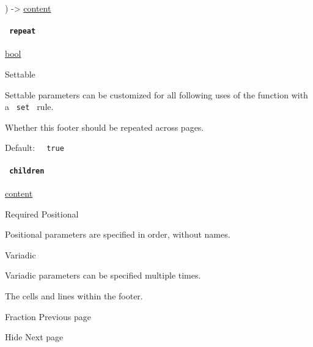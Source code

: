 ) -\textgreater{} \href{/docs/reference/foundations/content/}{content}

\paragraph{\texorpdfstring{\texttt{\ repeat\ }}{ repeat }}\label{definitions-footer-repeat}

\href{/docs/reference/foundations/bool/}{bool}

{{ Settable }}

\label{definitions-footer-repeat-settable-tooltip}
Settable parameters can be customized for all following uses of the
function with a \texttt{\ set\ } rule.

Whether this footer should be repeated across pages.

Default: \texttt{\ }{\texttt{\ true\ }}\texttt{\ }

\paragraph{\texorpdfstring{\texttt{\ children\ }}{ children }}\label{definitions-footer-children}

\href{/docs/reference/foundations/content/}{content}

{Required} {{ Positional }}

\label{definitions-footer-children-positional-tooltip}
Positional parameters are specified in order, without names.

{{ Variadic }}

\label{definitions-footer-children-variadic-tooltip}
Variadic parameters can be specified multiple times.

The cells and lines within the footer.

\href{/docs/reference/layout/fraction/}{\pandocbounded{}}

{ Fraction } { Previous page }

\href{/docs/reference/layout/hide/}{\pandocbounded{}}

{ Hide } { Next page }
